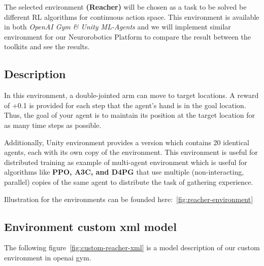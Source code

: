 The selected environment \textbf{(Reacher)} will be chosen as a task to be solved be different RL algorithms for continuous action space. This environment is available in both \textit{OpenAI Gym \& Unity ML-Agents} and we will implement similar environment for our Neurorobotics Platform to compare the result between the toolkits and see the results.

\subsection{Description}
In this environment, a double-jointed arm can move to target locations. A reward of +0.1 is provided for each step that the agent's hand is in the goal location. Thus, the goal of your agent is to maintain its position at the target location for as many time steps as possible.

Additionally, Unity environment provides a version which contains 20 identical agents, each with its own copy of the environment. This environment is useful for distributed training as example of multi-agent environment which is useful for algorithms like \textbf{PPO, A3C, and D4PG} that use multiple (non-interacting, parallel) copies of the same agent to distribute the task of gathering experience.

Illustration for the environments can be founded here:~\ref{fig:reacher-environment}



\clearpage

\subsection{Environment custom xml model}
The following figure~\ref{fig:custom-reacher-xml} is a model description of our custom environment in openai gym.

